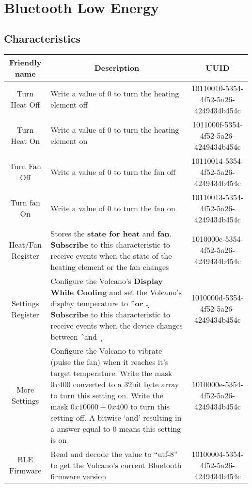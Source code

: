 \chapter{Bluetooth Low Energy}
\section{Characteristics}
\begin{longtable}{c|p{2.1in}|c}
\textbf{Friendly name} & \multicolumn{1}{|c|}{\textbf{Description}} & \textbf{UUID} \\ \hline
Turn Heat Off & Write a value of 0 to turn the heating element off & 10110010-5354-4f52-5a26-4249434b454c \\ \hline

Turn Heat On & Write a value of 0 to turn the heating element on & 1011000f-5354-4f52-5a26-4249434b454c \\ \hline

Turn Fan Off & Write a value of 0 to turn the fan off & 10110014-5354-4f52-5a26-4249434b454c\\ \hline

Turn fan On & Write a value of 0 to turn the fan on & 10110013-5354-4f52-5a26-4249434b454c\\ \hline

Heat/Fan Register & Stores the \textbf{state for heat} and \textbf{fan}.  \textbf{Subscribe} to this characteristic to receive events when the state of the heating element or the fan changes & 1010000c-5354-4f52-5a26-4249434b454c \\ \hline 

Settings Register & Configure the Volcano's \textbf{Display While Cooling} and set the Volcano's display temperature to \textbf{\f\ or \c.} \textbf{Subscribe} to this characteristic to receive events when the device changes between \f\ and \c\ & 1010000d-5354-4f52-5a26-4249434b454c \\ \hline

More Settings & Configure the Volcano to vibrate (pulse the fan) when it reaches it's target temperature. Write the mask $0x400$ converted to a 32bit byte array to turn this setting on. Write the mask $0x10000 + 0x400$ to turn this setting off. A bitwise `and' resulting in a answer equal to 0 means this setting is on   &  1010000e-5354-4f52-5a26-4249434b454c \\ \hline

BLE Firmware&Read and decode the value to ``utf-8'' to get the Volcano's current Bluetooth firmware version&10100004-5354-4f52-5a26-4249434b454c\\ \hline


\end{longtable}
